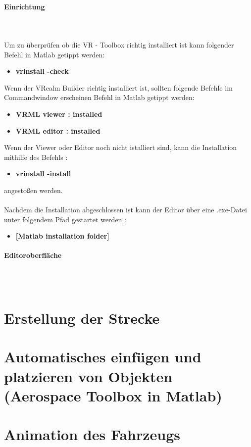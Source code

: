 \paragraph{Einrichtung} \ \\ \\
Um zu überprüfen ob die VR - Toolbox richtig installiert ist kann folgender Befehl in Matlab getippt werden: \begin{itemize}
	\item[] \textbf{vrinstall -check}
\end{itemize}
 Wenn der VRealm Builder richtig installiert ist, sollten folgende Befehle im Commandwindow erscheinen
 Befehl in Matlab getippt werden: \begin{itemize}
 	\item[] \textbf{VRML viewer : installed}
 	 \item[] \textbf{VRML editor : installed}
 \end{itemize}
 Wenn der Viewer oder Editor noch nicht istalliert sind, kann die Installation mithilfe des Befehls :
  \begin{itemize}
  	\item[] \textbf{vrinstall -install}
    \end{itemize}
 angestoßen werden.\\ \\
 Nachdem die Installation abgeschlossen ist kann der Editor über eine .exe-Datei unter folgendem Pfad gestartet werden : 
  \begin{itemize}
  	\item[] \textbf{[Matlab installation folder]}
  \end{itemize}
  \paragraph{Editoroberfläche} \ \\ \\

\section{Erstellung der Strecke}
\section{Automatisches einfügen und platzieren von Objekten (Aerospace Toolbox in Matlab)}
\section{Animation des Fahrzeugs}


